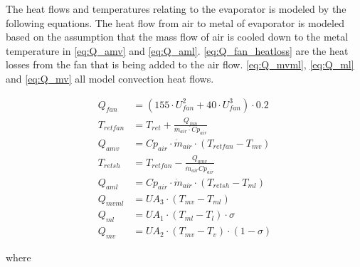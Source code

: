 The heat flows and temperatures relating to the evaporator is modeled by the following equations. The heat flow from air to  metal of evaporator is modeled based on the assumption that the mass flow of air is cooled down to the metal temperature in \cref{eq:Q_amv} and \cref{eq:Q_aml}. \cref{eq:Q_fan_heatloss}  are the heat losses from the fan that is being added to the air flow. \cref{eq:Q_mvml}, \cref{eq:Q_ml} and \cref{eq:Q_mv} all model convection heat flows.
 
 
\begin{align}
	Q_{fan} 		& = (155 \cdot U_{fan}^2 + 40 \cdot U_{fan}^3) \cdot 0.2  		\label{eq:Q_fan_heatloss} 	\\
	T_{retfan} 		& = T_{ret} + \frac{Q_{fan}}{\dot{m}_{air} \cdot Cp_{air}} 		\label{eq:T_retfan} 		\\
	Q_{amv} 		& = Cp_{air} \cdot \dot{m}_{air} \cdot (T_{retfan} - T_{mv}) 	\label{eq:Q_amv} 			\\
	T_{retsh} 		& = T_{retfan} - \frac{Q_{amv}}{\dot{m}_{air} \dot Cp_{air}} 	\label{eq:T_retsh} 			\\
	Q_{aml} 		& = Cp_{air} \cdot \dot{m}_{air} \cdot (T_{retsh} - T_{ml}) 	\label{eq:Q_aml} 			\\
	Q_{mvml} 		& = U A_3 \cdot (T_{mv} - T_{ml}) 								\label{eq:Q_mvml} 			\\
	Q_{ml} 			& = U A_1 \cdot (T_{ml} - T_l) \cdot \sigma						\label{eq:Q_ml} 			\\
	Q_{mv} 			& = U A_2 \cdot (T_{mv} - T_v) \cdot (1- \sigma)                \label{eq:Q_mv} 
\end{align}

where

